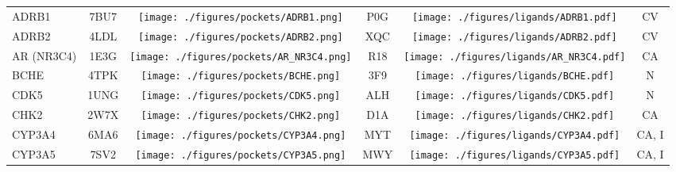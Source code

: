 \begin{ThreePartTable}
\begin{longtable}{ l @{\extracolsep{\fill}} *{5}{c} }
ADRB1                                 & 7BU7            &   \texttt{[image: ./figures/pockets/ADRB1.png]}                        & P0G                    & \texttt{[image: ./figures/ligands/ADRB1.pdf]}                                                  & CV                              \\
ADRB2                                 & 4LDL            &   \texttt{[image: ./figures/pockets/ADRB2.png]}                        & XQC                    &\texttt{[image: ./figures/ligands/ADRB2.pdf]}                                                  & CV                              \\
AR (NR3C4)                            & 1E3G            &    \texttt{[image: ./figures/pockets/AR\_NR3C4.png]}                       & R18                    &\texttt{[image: ./figures/ligands/AR\_NR3C4.pdf]}                                                 & CA                                              \\
BCHE                                  & 4TPK            &    \texttt{[image: ./figures/pockets/BCHE.png]}                       & 3F9                    &\texttt{[image: ./figures/ligands/BCHE.pdf]}                                                 & N                             \\
CDK5                                  & 1UNG            &     \texttt{[image: ./figures/pockets/CDK5.png]}                      & ALH                    &\texttt{[image: ./figures/ligands/CDK5.pdf]}                                                & N                             \\
CHK2                                  & 2W7X            &      \texttt{[image: ./figures/pockets/CHK2.png]}                     & D1A                    &\texttt{[image: ./figures/ligands/CHK2.pdf]}                                               & CA                                              \\
CYP3A4                                & 6MA6            &      \texttt{[image: ./figures/pockets/CYP3A4.png]}                     & MYT                    &\texttt{[image: ./figures/ligands/CYP3A4.pdf]}                                               & CA, I                          \\
CYP3A5                                & 7SV2            &      \texttt{[image: ./figures/pockets/CYP3A5.png]}                     & MWY                    &\texttt{[image: ./figures/ligands/CYP3A5.pdf]}                                               & CA, I                          \\

\end{longtable}
\end{ThreePartTable}

